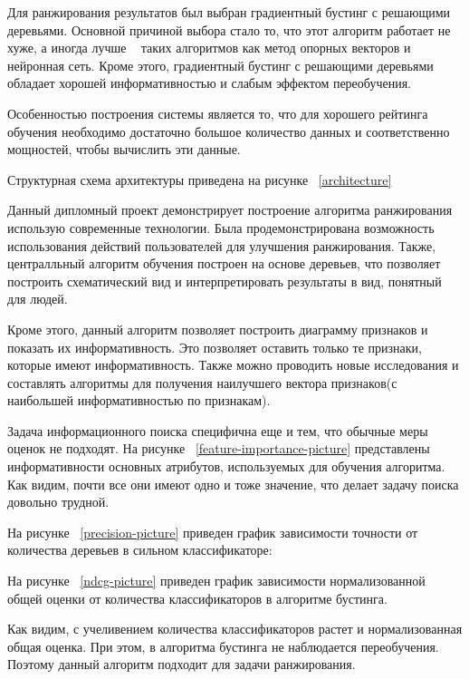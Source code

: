 Для ранжирования результатов был выбран градиентный бустинг с решающими деревьями. Основной причиной выбора стало то, что этот алгоритм работает не хуже, а иногда лучше ~\cite{cart_estimation_book} таких алгоритмов как метод опорных векторов и нейронная сеть. Кроме этого, градиентный бустинг с решающими деревьями обладает хорошей информативностью и слабым эффектом переобучения. ~\cite{cart_estimation_book}

Особенностью построения системы является то, что для хорошего рейтинга обучения необходимо достаточно большое количество данных и соответственно мощностей, чтобы вычислить эти данные. 

Структурная схема архитектуры приведена на рисунке ~\ref{architecture}

Данный дипломный проект демонстрирует построение алгоритма ранжирования использую современные технологии. Была продемонстрирована возможность использования действий пользователей для улучшения ранжирования. Также, централльный алгоритм обучения построен на основе деревьев, что позволяет построить схематический вид и интерпретировать результаты в вид, понятный для людей. 

Кроме этого, данный алгоритм позволяет построить диаграмму признаков и показать их информативность. Это позволяет оставить только те признаки, которые имеют информативность. Также можно проводить новые исследования и составлять алгоритмы для получения наилучшего вектора признаков(с наибольшей информативностью по признакам).

Задача информационного поиска специфична еще и тем, что обычные меры оценок не подходят. На рисунке ~\ref{feature-importance-picture} представлены информативности основных атрибутов, используемых для обучения алгоритма. Как видим, почти все они имеют одно и тоже значение, что делает задачу поиска довольно трудной.

На рисунке ~\ref{precision-picture} приведен график зависимости точности от количества деревьев в сильном классификаторе:


На рисунке ~\ref{ndcg-picture} приведен график зависимости нормализованной общей оценки от количества классификаторов в алгоритме бустинга. 

Как видим, с учеливением количества классификаторов растет и нормализованная общая оценка. При этом, в алгоритма бустинга не наблюдается переобучения. Поэтому данный алгоритм подходит для задачи ранжирования.

\newpage
